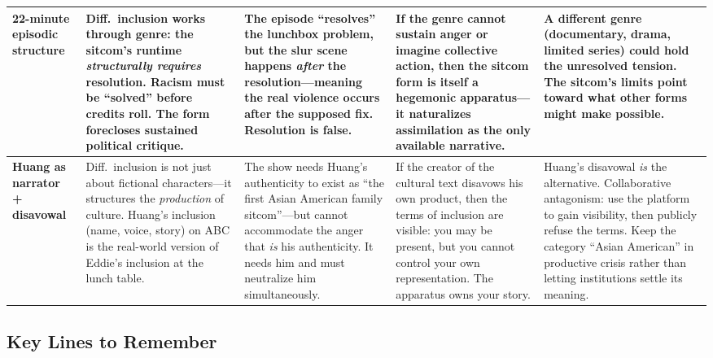 \documentclass[12pt]{article}
\begin{document}
\begin{tabularx}{\textwidth}{|>{\raggedright\arraybackslash\bfseries}p{1.8cm}|X|X|X|X|}
22-minute episodic structure &
Diff.\ inclusion works through genre: the sitcom's runtime \textit{structurally requires} resolution. Racism must be ``solved'' before credits roll. The form forecloses sustained political critique. &
The episode ``resolves'' the lunchbox problem, but the slur scene happens \textit{after} the resolution---meaning the real violence occurs after the supposed fix. Resolution is false. &
If the genre cannot sustain anger or imagine collective action, then the sitcom form is itself a hegemonic apparatus---it naturalizes assimilation as the only available narrative. &
A different genre (documentary, drama, limited series) could hold the unresolved tension. The sitcom's limits point toward what other forms might make possible. \\
\hline

Huang as narrator + disavowal &
Diff.\ inclusion is not just about fictional characters---it structures the \textit{production} of culture. Huang's inclusion (name, voice, story) on ABC is the real-world version of Eddie's inclusion at the lunch table. &
The show needs Huang's authenticity to exist as ``the first Asian American family sitcom''---but cannot accommodate the anger that \textit{is} his authenticity. It needs him and must neutralize him simultaneously. &
If the creator of the cultural text disavows his own product, then the terms of inclusion are visible: you may be present, but you cannot control your own representation. The apparatus owns your story. &
Huang's disavowal \textit{is} the alternative. Collaborative antagonism: use the platform to gain visibility, then publicly refuse the terms. Keep the category ``Asian American'' in productive crisis rather than letting institutions settle its meaning. \\
\hline

\end{tabularx}

\vspace{12pt}
\subsection*{Key Lines to Remember}
\end{document}
